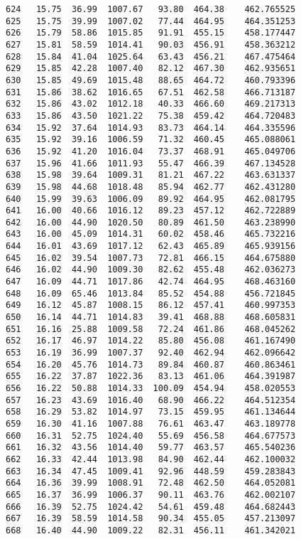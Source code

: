 \documentclass[11pt]{article}
\begin{document}
\begin{tcolorbox}[breakable, size=fbox, boxrule=.5pt, pad at break*=1mm, opacityfill=0]
\begin{Verbatim}[commandchars=\\\{\}]
624   15.75  36.99  1007.67   93.80  464.38    462.765525
625   15.75  39.99  1007.02   77.44  464.95    464.351253
626   15.79  58.86  1015.85   91.91  455.15    458.177447
627   15.81  58.59  1014.41   90.03  456.91    458.363212
628   15.84  41.04  1025.64   63.43  456.21    467.475464
629   15.85  42.28  1007.40   82.12  467.30    462.935651
630   15.85  49.69  1015.48   88.65  464.72    460.793396
631   15.86  38.62  1016.65   67.51  462.58    466.713187
632   15.86  43.02  1012.18   40.33  466.60    469.217313
633   15.86  43.50  1021.22   75.38  459.42    464.720483
634   15.92  37.64  1014.93   83.73  464.14    464.335596
635   15.92  39.16  1006.59   71.32  460.45    465.088061
636   15.92  41.20  1016.04   73.37  468.91    465.049706
637   15.96  41.66  1011.93   55.47  466.39    467.134528
638   15.98  39.64  1009.31   81.21  467.22    463.631337
639   15.98  44.68  1018.48   85.94  462.77    462.431280
640   15.99  39.63  1006.09   89.92  464.95    462.081795
641   16.00  40.66  1016.12   89.23  457.12    462.722889
642   16.00  44.90  1020.50   80.89  461.50    463.238990
643   16.00  45.09  1014.31   60.02  458.46    465.732216
644   16.01  43.69  1017.12   62.43  465.89    465.939156
645   16.02  39.54  1007.73   72.81  466.15    464.675880
646   16.02  44.90  1009.30   82.62  455.48    462.036273
647   16.09  44.71  1017.86   42.74  464.95    468.463160
648   16.09  65.46  1013.84   85.52  454.88    456.721845
649   16.12  45.87  1008.15   86.12  457.41    460.997353
650   16.14  44.71  1014.83   39.41  468.88    468.605831
651   16.16  25.88  1009.58   72.24  461.86    468.045262
652   16.17  46.97  1014.22   85.80  456.08    461.167490
653   16.19  36.99  1007.37   92.40  462.94    462.096642
654   16.20  45.76  1014.73   89.84  460.87    460.863461
655   16.22  37.87  1022.36   83.13  461.06    464.391987
656   16.22  50.88  1014.33  100.09  454.94    458.020553
657   16.23  43.69  1016.40   68.90  466.22    464.512354
658   16.29  53.82  1014.97   73.15  459.95    461.134644
659   16.30  41.16  1007.88   76.61  463.47    463.189778
660   16.31  52.75  1024.40   55.69  456.58    464.677573
661   16.32  43.56  1014.40   59.77  463.57    465.540236
662   16.33  42.44  1013.98   84.90  462.44    462.100032
663   16.34  47.45  1009.41   92.96  448.59    459.283843
664   16.36  39.99  1008.91   72.48  462.50    464.052081
665   16.37  36.99  1006.37   90.11  463.76    462.002107
666   16.39  52.75  1024.42   54.61  459.48    464.682443
667   16.39  58.59  1014.58   90.34  455.05    457.213097
668   16.40  44.90  1009.22   82.31  456.11    461.342021

\end{Verbatim}
\end{tcolorbox}
\end{document}
